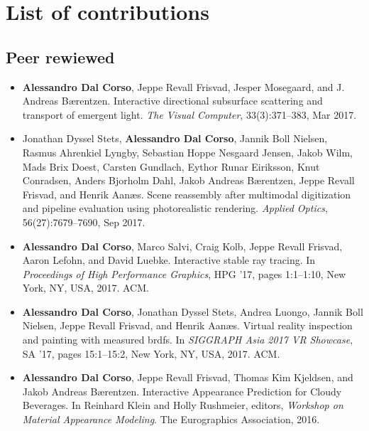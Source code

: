 \chapter*{List of contributions}
\label{sec:contributionlist}
\section*{Peer rewiewed}
\begin{itemize}
\item \textbf{Alessandro Dal Corso}, Jeppe Revall Frisvad, Jesper Mosegaard, and J. Andreas Bærentzen. Interactive directional subsurface scattering and transport of emergent light. \textit{The Visual Computer}, 33(3):371–383, Mar 2017.~\cite{dalcorso17dirsss}
\item Jonathan Dyssel Stets, \textbf{Alessandro Dal Corso}, Jannik Boll Nielsen, Rasmus Ahrenkiel Lyngby, Sebastian Hoppe Nesgaard Jensen, Jakob Wilm, Mads Brix Doest, Carsten Gundlach, Eythor Runar Eiriksson, Knut Conradsen, Anders Bjorholm Dahl, Jakob Andreas Bærentzen, Jeppe Revall Frisvad, and Henrik Aanæs. Scene reassembly after multimodal digitization and pipeline evaluation using photorealistic rendering. \textit{Applied Optics}, 56(27):7679–7690, Sep 2017.~\cite{stets17}
\item \textbf{Alessandro Dal Corso}, Marco Salvi, Craig Kolb, Jeppe Revall Frisvad, Aaron Lefohn, and David Luebke. Interactive stable ray tracing. In \textit{Proceedings of High Performance Graphics}, HPG ’17, pages 1:1–1:10, New York, NY, USA, 2017. ACM. \cite{dalcorso17hpg}
\item \textbf{Alessandro Dal Corso}, Jonathan Dyssel Stets, Andrea Luongo, Jannik Boll Nielsen, Jeppe Revall Frisvad, and Henrik Aanæs. Virtual reality inspection and painting with measured brdfs. In \textit{SIGGRAPH Asia 2017 VR Showcase}, SA ’17, pages 15:1–15:2, New York, NY, USA, 2017. ACM.~\cite{dalcorso17vr}
\item \textbf{Alessandro Dal Corso}, Jeppe Revall Frisvad, Thomas Kim Kjeldsen, and Jakob Andreas Bærentzen. Interactive Appearance Prediction for Cloudy Beverages. In Reinhard Klein and Holly Rushmeier, editors, \textit{Workshop on Material Appearance Modeling}. The Eurographics Association, 2016.~\cite{dalcorsomam16}
\end{itemize}

